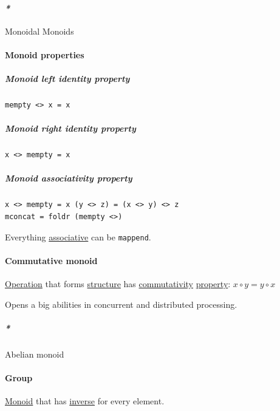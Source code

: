 \documentclass[a4paper,14pt,oneside]{book}
\begin{document}
\paragraph{\emph{*}}
\label{sec:org56a1d9a}

\label{org1bd8c20}Monoidal
\label{orgad31a45}Monoids

\paragraph{\label{org1f0ccd5}Monoid properties}
\label{sec:org85093ab}
\subparagraph{\label{orgcebd454}Monoid left identity property}
\label{sec:orgcb51943}
\begin{verbatim}
mempty <> x = x
\end{verbatim}

\subparagraph{\label{orgeeefaa3}Monoid right identity property}
\label{sec:orgeb839db}
\begin{verbatim}
x <> mempty = x
\end{verbatim}

\subparagraph{\label{org4ed4b9a}Monoid associativity property}
\label{sec:org7c83656}
\begin{verbatim}
x <> mempty = x (y <> z) = (x <> y) <> z
mconcat = foldr (mempty <>)
\end{verbatim}

Everything \hyperref[org7d38c6c]{associative} can be \texttt{mappend}.

\paragraph{\label{org4e87fe8}Commutative monoid}
\label{sec:orgf8b9bc0}
\hyperref[org0f0efbc]{Operation} that forms \hyperref[orgd9cd153]{structure} has \hyperref[orgea518e8]{commutativity} \hyperref[org979fccb]{property}:
\(x \circ y = y \circ x\)

Opens a big abilities in concurrent and distributed processing.

\subparagraph{\emph{*}}
\label{sec:org714f4b1}

\label{org55a56dd}Abelian monoid

\paragraph{\label{org3edd667}Group}
\label{sec:orgb110645}
\hyperref[org2993534]{Monoid} that has \hyperref[org243b59b]{inverse} for every element.
\end{document}
